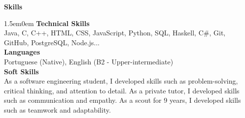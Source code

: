 \noindent\textbf{Skills}
\noindent\hrulefill
\vspace{0.25em}
\begin{adjustwidth}{1.5em}{0em}
\textbf{Technical Skills}\\
Java, C, C++, HTML, CSS, JavaScript, Python, SQL, Haskell, C\#, Git, GitHub, PostgreSQL, Node.js...
\vspace{0.5em}
\\
\textbf{Languages}\\
Portuguese (Native), English (B2 - Upper-intermediate)
\vspace{0.5em}
\\
\textbf{Soft Skills}\\
As a software engineering student, I developed skills such as problem-solving, critical thinking, and attention to detail.
As a private tutor, I developed skills such as communication and empathy.
As a scout for 9 years, I developed skills such as teamwork and adaptability.
\end{adjustwidth}
\vspace{0.25em}